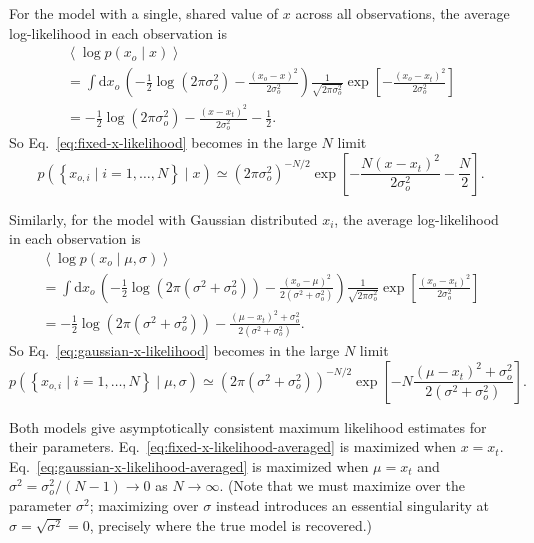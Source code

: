 \documentclass[modern]{aastex631}
\begin{document}
For the model with a single, shared value of $x$ across all observations, the
average log-likelihood in each observation is
\begin{multline}
    \left\langle \log p\left( x_{o} \mid x \right) \right\rangle \\ = \int \mathrm{d} x_o \, \left( -\frac{1}{2} \log \left( 2 \pi \sigma_o^2 \right) - \frac{\left( x_{o} - x \right)^2}{2 \sigma_o^2} \right) \frac{1}{\sqrt{2\pi\sigma_o^2}} \exp\left[-\frac{\left( x_o - x_t \right)^2}{2 \sigma_o^2} \right] \\ = -\frac{1}{2} \log \left( 2 \pi \sigma_o^2 \right) - \frac{\left( x - x_t \right)^2}{2 \sigma_o^2} - \frac{1}{2}.
\end{multline}
So Eq.\ \eqref{eq:fixed-x-likelihood} becomes in the large $N$ limit
\begin{equation}
    \label{eq:fixed-x-likelihood-averaged}
    p\left(  \left\{ x_{o,i} \mid i = 1, \ldots, N \right\} \mid x \right) \simeq \left( 2 \pi \sigma_o^2 \right)^{-N/2} \exp\left[ -\frac{N \left( x - x_t \right)^2}{2 \sigma_o^2} - \frac{N}{2} \right].
\end{equation}

Similarly, for the model with Gaussian distributed $x_i$, the average
log-likelihood in each observation is 
\begin{multline}
    \left\langle \log p\left( x_{o} \mid \mu, \sigma \right) \right\rangle \\ = \int \mathrm{d} x_o \, \left( - \frac{1}{2} \log \left( 2 \pi \left( \sigma^2 + \sigma_o^2 \right) \right) - \frac{\left( x_o - \mu \right)^2}{2 \left( \sigma^2 + \sigma_o^2 \right)} \right) \frac{1}{\sqrt{2 \pi \sigma_o^2}} \exp\left[ \frac{\left( x_o - x_t \right)^2}{2 \sigma_o^2} \right] \\ = -\frac{1}{2} \log \left( 2 \pi \left( \sigma^2 + \sigma_o^2 \right)\right) - \frac{\left( \mu - x_t \right)^2 + \sigma_o^2}{2 \left( \sigma^2 + \sigma_o^2 \right)}.
\end{multline}
So Eq.\ \eqref{eq:gaussian-x-likelihood} becomes in the large $N$ limit 
\begin{equation}
    \label{eq:gaussian-x-likelihood-averaged}
    p\left( \left\{ x_{o,i} \mid i = 1, \ldots, N \right\} \mid \mu, \sigma \right) \simeq \left( 2 \pi \left( \sigma^2 + \sigma_o^2 \right)\right)^{-N/2} \exp\left[ - N \frac{\left( \mu - x_t \right)^2 + \sigma_o^2}{2 \left( \sigma^2 + \sigma_o^2 \right)} \right].
\end{equation}

Both models give asymptotically consistent maximum likelihood estimates for
their parameters.  Eq.\ \eqref{eq:fixed-x-likelihood-averaged} is maximized when
$x = x_t$.  Eq.\ \eqref{eq:gaussian-x-likelihood-averaged} is maximized when
$\mu = x_t$ and $\sigma^2 = \sigma_o^2 / \left( N - 1 \right) \to 0$ as $N \to
\infty$.  (Note that we must maximize over the parameter $\sigma^2$; maximizing
over $\sigma$ instead introduces an essential singularity at $\sigma =
\sqrt{\sigma^2} = 0$, precisely where the true model is recovered.)
\end{document}
